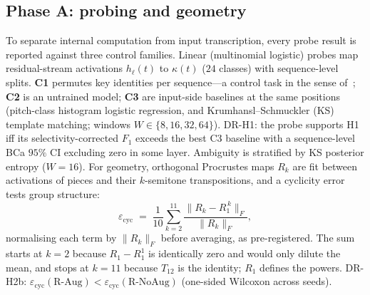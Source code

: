 \documentclass[conference]{IEEEtran}
\newcommand{\ecyc}{\varepsilon_{\mathrm{cyc}}}
\begin{document}
\subsection{Phase A: probing and geometry}
To separate internal computation from input transcription, every probe result is
reported against three control families. Linear (multinomial logistic) probes map
residual-stream activations $h_{\ell}(t)$ to $\kappa(t)$ ($24$ classes) with
sequence-level splits. \textbf{C1} permutes key identities per sequence---a
control task in the sense of~\cite{hewitt2019control}; \textbf{C2} is an untrained
model; \textbf{C3} are input-side baselines at the same positions (pitch-class
histogram logistic regression, and Krumhansl--Schmuckler (KS) template matching;
windows $W\in\{8,16,32,64\}$). DR-H1: the probe supports H1 iff its
selectivity-corrected $F_1$ exceeds the best C3 baseline with a sequence-level BCa
$95\%$ CI excluding zero in some layer. Ambiguity is stratified by KS posterior
entropy ($W{=}16$). For geometry, orthogonal Procrustes maps $R_k$ are fit between
activations of pieces and their $k$-semitone transpositions, and a cyclicity error
tests group structure:
\begin{equation}
\ecyc \;=\; \frac{1}{10}\sum_{k=2}^{11}
\frac{\lVert R_k - R_1^{\,k}\rVert_F}{\lVert R_k\rVert_F},
\label{eq:cyc}
\end{equation}
normalising each term by $\lVert R_k\rVert_F$ before averaging, as pre-registered. The
sum starts at $k{=}2$ because $R_1 - R_1^{1}$ is identically zero and would only dilute
the mean, and stops at $k{=}11$ because $T_{12}$ is the identity; $R_1$ defines the
powers. DR-H2b: $\ecyc(\text{R-Aug}) < \ecyc(\text{R-NoAug})$ (one-sided Wilcoxon
across seeds).
\end{document}
